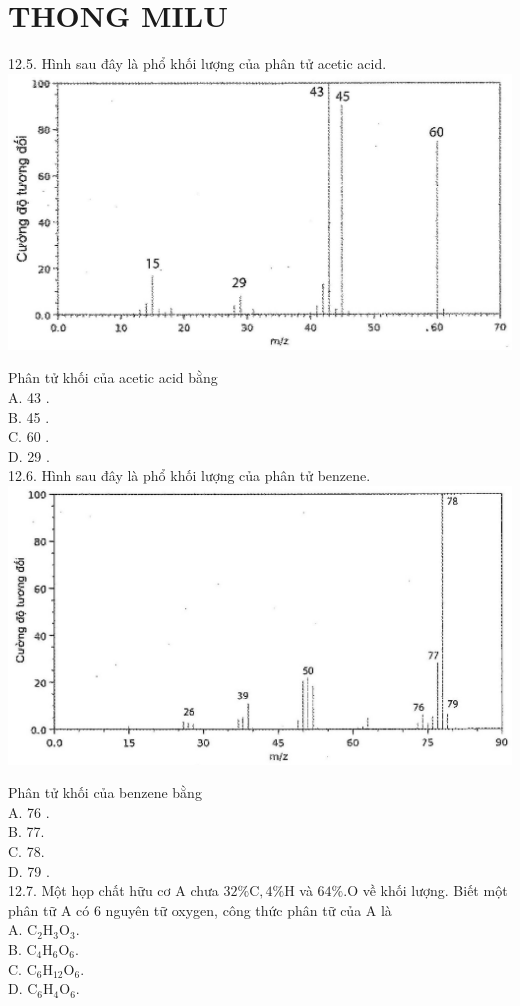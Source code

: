 \documentclass[10pt]{article}
\begin{document}
\section*{THONG MILU}
12.5. Hình sau đây là phổ khối lượng của phân tử acetic acid.\\
\includegraphics[max width=\textwidth, center]{2025_10_23_fa9073eecee116ad8cf2g-42(1)}

Phân tử khối của acetic acid bằng\\
A. 43 .\\
B. 45 .\\
C. 60 .\\
D. 29 .\\
12.6. Hình sau đây là phổ khối lượng của phân tử benzene.\\
\includegraphics[max width=\textwidth, center]{2025_10_23_fa9073eecee116ad8cf2g-42}

Phân tử khối của benzene bằng\\
A. 76 .\\
B. 77.\\
C. 78.\\
D. 79 .\\
12.7. Một họp chất hữu cơ A chưa $32 \% \mathrm{C}, 4 \% \mathrm{H}$ và $64 \% . \mathrm{O}$ về khối lượng. Biết một phân tữ A có 6 nguyên tữ oxygen, công thức phân tữ của A là\\
A. $\mathrm{C}_{2} \mathrm{H}_{3} \mathrm{O}_{3}$.\\
B. $\mathrm{C}_{4} \mathrm{H}_{6} \mathrm{O}_{6}$.\\
C. $\mathrm{C}_{6} \mathrm{H}_{12} \mathrm{O}_{6}$.\\
D. $\mathrm{C}_{6} \mathrm{H}_{4} \mathrm{O}_{6}$.
\end{document}
